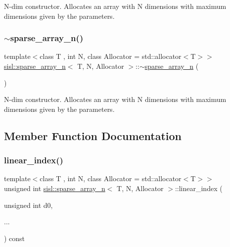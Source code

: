 N-\/dim constructor. Allocates an array with N dimensions with maximum dimensions given by the parameters. \mbox{\label{classsisl_1_1sparse__array__n_ae639c5c814a4649fcfa5ea2616e51f12}} 
\subsubsection{\texorpdfstring{$\sim$sparse\+\_\+array\+\_\+n()}{~sparse\_array\_n()}}
{\footnotesize\ttfamily template$<$class T , int N, class Allocator  = std\+::allocator$<$\+T$>$$>$ \\
\hyperlink{classsisl_1_1sparse__array__n}{sisl\+::sparse\+\_\+array\+\_\+n}$<$ T, N, Allocator $>$\+::$\sim$\hyperlink{classsisl_1_1sparse__array__n}{sparse\+\_\+array\+\_\+n} (\begin{DoxyParamCaption}{ }\end{DoxyParamCaption})\hspace{0.3cm}{\ttfamily [inline]}}

N-\/dim constructor. Allocates an array with N dimensions with maximum dimensions given by the parameters. 

\subsection{Member Function Documentation}
\mbox{\label{classsisl_1_1sparse__array__n_a4418f97d93ce2a6cef4639ed371ee47e}} 
\subsubsection{\texorpdfstring{linear\+\_\+index()}{linear\_index()}\hspace{0.1cm}{\footnotesize\ttfamily [1/3]}}
{\footnotesize\ttfamily template$<$class T , int N, class Allocator  = std\+::allocator$<$\+T$>$$>$ \\
unsigned int \hyperlink{classsisl_1_1sparse__array__n}{sisl\+::sparse\+\_\+array\+\_\+n}$<$ T, N, Allocator $>$\+::linear\+\_\+index (\begin{DoxyParamCaption}\item[{unsigned int}]{d0,  }\item[{}]{... }\end{DoxyParamCaption}) const\hspace{0.3cm}{\ttfamily [inline]}}

